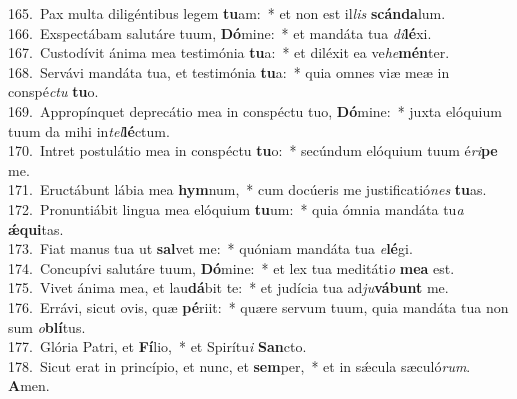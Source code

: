 {165.~}Pax multa diligéntibus legem \textbf{tu}am:~* et non est il\textit{lis} \textbf{scán}\textbf{da}lum.\\
{166.~}Exspectábam salutáre tuum, \textbf{Dó}mine:~* et mandáta tua \textit{di}\textbf{lé}xi.\\
{167.~}Custodívit ánima mea testimónia \textbf{tu}a:~* et diléxit ea ve\textit{he}\textbf{mén}ter.\\
{168.~}Servávi mandáta tua, et testimónia \textbf{tu}a:~* quia omnes viæ meæ in conspé\textit{ctu} \textbf{tu}o.\\
{169.~}Appropínquet deprecátio mea in conspéctu tuo, \textbf{Dó}mine:~* juxta elóquium tuum da mihi in\textit{tel}\textbf{lé}ctum.\\
{170.~}Intret postulátio mea in conspéctu \textbf{tu}o:~* secúndum elóquium tuum é\textit{ri}\textbf{pe} me.\\
{171.~}Eructábunt lábia mea \textbf{hym}num,~* cum docúeris me justificatió\textit{nes} \textbf{tu}as.\\
{172.~}Pronuntiábit lingua mea elóquium \textbf{tu}um:~* quia ómnia mandáta tu\textit{a} \textbf{ǽ}\textbf{qui}tas.\\
{173.~}Fiat manus tua ut \textbf{sal}vet me:~* quóniam mandáta tua \textit{e}\textbf{lé}gi.\\
{174.~}Concupívi salutáre tuum, \textbf{Dó}mine:~* et lex tua meditáti\textit{o} \textbf{me}\textbf{a} est.\\
{175.~}Vivet ánima mea, et lau\textbf{dá}bit te:~* et judícia tua ad\textit{ju}\textbf{vá}\textbf{bunt} me.\\
{176.~}Errávi, sicut ovis, quæ \textbf{pé}riit:~* quære servum tuum, quia mandáta tua non sum \textit{o}\textbf{blí}tus.\\
{177.~}Glória Patri, et \textbf{Fí}lio,~* et Spirítu\textit{i} \textbf{San}cto.\\
{178.~}Sicut erat in princípio, et nunc, et \textbf{sem}per,~* et in sǽcula sæculó\textit{rum}. \textbf{A}men.\\
